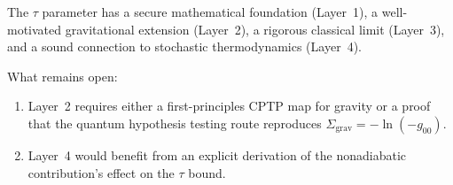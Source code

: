 \documentclass[prl,twocolumn,superscriptaddress,longbibliography,floatfix]{revtex4-2}
\newcommand{\tauasym}{\tau}
\begin{document}
The $\tauasym$ parameter has a secure mathematical foundation
(Layer~1), a well-motivated gravitational extension (Layer~2),
a rigorous classical limit (Layer~3), and a sound connection to
stochastic thermodynamics (Layer~4).

What remains open:
\begin{enumerate}
\item Layer~2 requires either a first-principles CPTP map for
gravity or a proof that the quantum hypothesis testing route
reproduces $\Sigma_{\text{grav}} = -\ln(-g_{00})$.
\item Layer~4 would benefit from an explicit derivation of
the nonadiabatic contribution's effect on the $\tauasym$ bound.
\end{enumerate}

\end{document}
